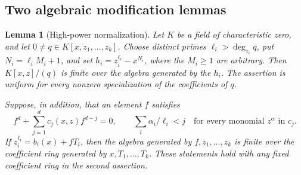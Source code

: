 \documentclass[11pt,reqno]{amsart}
\numberwithin{equation}{section}
\theoremstyle{plain}
\newtheorem{lemma}[theorem]{Lemma}
\theoremstyle{definition}
\theoremstyle{remark}
\begin{document}
\subsection{Two algebraic modification lemmas}

\begin{lemma}[High-power normalization]\label{lem:relative-normalization}
Let \(K\) be a field of characteristic zero, and let
\(0\ne q\in K[x,z_1,\ldots,z_k]\).  Choose distinct primes
\(\ell_i>\deg_{z_i}q\), put \(N_i=\ell_iM_i+1\), and set
\(h_i=z_i^{\ell_i}-x^{N_i}\), where the \(M_i\ge1\) are arbitrary.
Then \(K[x,z]/(q)\) is finite over the algebra generated by the
\(h_i\).  The assertion is uniform for every nonzero specialization
of the coefficients of \(q\).

Suppose, in addition, that an element \(f\) satisfies
\begin{equation}\label{eq:relative-weight-bound}
f^d+\sum_{j=1}^d c_j(x,z)f^{d-j}=0,
 \qquad
 \sum_i\alpha_i/\ell_i<j
 \quad\text{for every monomial }z^\alpha\text{ in }c_j.
\end{equation}
If \(z_i^{\ell_i}=b_i(x)+fT_i\), then the algebra generated by
\(f,z_1,\ldots,z_k\) is finite over the coefficient ring generated
by \(x,T_1,\ldots,T_k\).  These statements hold with any fixed
coefficient ring in the second assertion.
\end{lemma}
\end{document}
